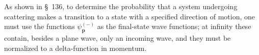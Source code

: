 As shown in \S~136, to determine the probability that a system undergoing scattering makes a transition to a state with a specified direction of motion, one must use the functions $\psi_{\mathbf p}^{(-)}$ as the final-state wave functions; at infinity these contain, besides a plane wave, only an incoming wave, and they must be normalized to a delta-function in momentum.
